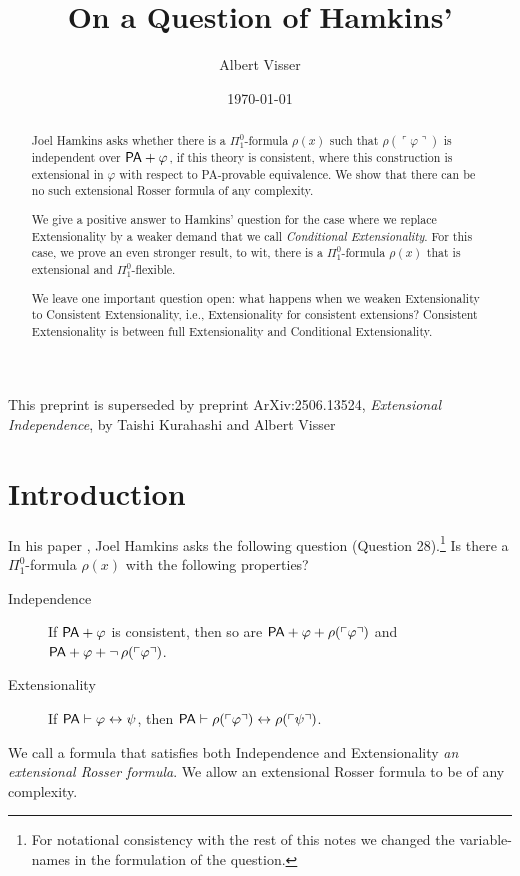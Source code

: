 \documentclass{amsart}
\title{On a Question of Hamkins'}
\author{Albert Visser}
\date{\today}
\renewcommand{\iff}{\leftrightarrow}
\renewcommand{\phi}{\varphi}
\newcommand{\gnum}[1]{{\ulcorner #1 \urcorner}}
\begin{document}
\begin{abstract}
Joel Hamkins asks whether there is a $\Pi^0_1$-formula $\rho(x)$ such that
$\rho(\gnum \phi)$ is independent over ${\sf PA}+\phi$, if this theory is consistent, where
this construction is extensional in $\phi$ with respect to {\sf PA}-provable equivalence.
We show that there can be no such extensional Rosser formula of any complexity.

We give a positive answer to Hamkins' question for the case where we replace
Extensionality by a weaker demand that we call \emph{Conditional Extensionality}. 
For this case, we prove an even stronger result, to wit, there is a $\Pi^0_1$-formula $\rho(x)$
that is extensional and $\Pi^0_1$-flexible.

We leave one important question open: what
happens when we weaken Extensionality to Consistent Extensionality, i.e., Extensionality for consistent extensions?
Consistent Extensionality is between full Extensionality and Conditional Extensionality.
\end{abstract}


\maketitle

{\Large
\textcolor{uuxred}{This preprint is superseded by preprint ArXiv:2506.13524, \emph{Extensional Independence}, by Taishi Kurahashi and Albert Visser}
}

\section{Introduction}
In his paper \cite{hamk:nonl22},  Joel Hamkins asks the following question (Question 28).\footnote{For notational consistency
with the rest of this notes we changed the variable-names in the formulation of the question.}
Is there a $\Pi^0_1$-formula $\rho(x)$ with the following properties?
\begin{description}
\item[Independence]  If ${\sf PA}+ \phi$ is consistent, then so are ${\sf PA}+ \phi+\rho(\gnum\phi)$ and\\
 ${\sf PA}+ \phi+\neg\, \rho(\gnum\phi)$.
\item[Extensionality] If ${\sf PA} \vdash \phi \iff \psi$, then  $ {\sf PA} \vdash\rho(\gnum \phi) \iff \rho(\gnum\psi)$.
\end{description}

\noindent
We call a formula that satisfies both Independence and Extensionality \emph{an extensional Rosser formula}.
We allow an extensional Rosser formula to be of any complexity.
\end{document}
